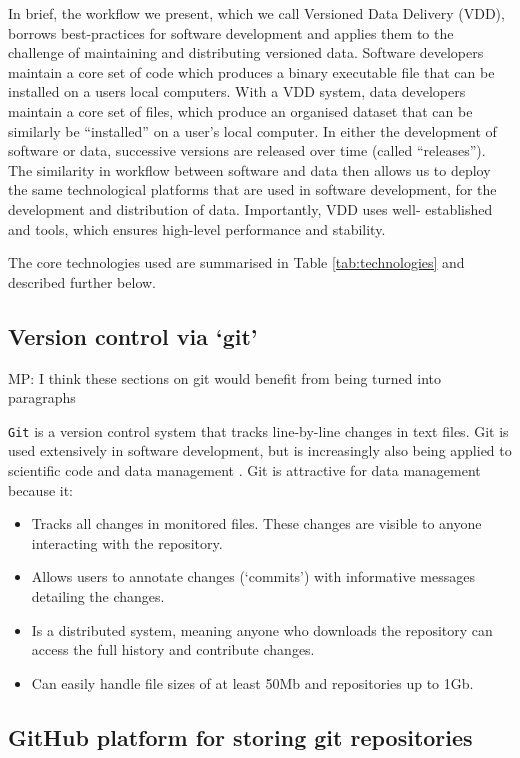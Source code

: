 \documentclass[a4paper,11pt]{article}
\begin{document}
In brief, the workflow we present, which we call Versioned Data Delivery (VDD), borrows best-practices for software
development and applies them to the challenge of maintaining and distributing
versioned data. Software developers maintain a core set of code which produces
a binary executable file that can be installed on a users local  computers. With a VDD system, data developers maintain a core set of files, which produce an
organised dataset that can be similarly be ``installed'' on a user's local
computer. In either the development of software or data, successive versions
are released over time (called ``releases''). The similarity in workflow
between software and data then allows us to deploy the same technological
platforms that are used in software development, for the development and
distribution of data. Importantly, VDD uses well-
established and tools, which ensures high-level performance and stability.

The core technologies used are summarised in Table \ref{tab:technologies} and
described further below.

\subsection{Version control via `git'}

MP: I think these sections on git would benefit from being turned into paragraphs

\texttt{Git} is a version control system that tracks line-by-line changes in text
files. Git is used extensively in software development, but is increasingly
also being applied to scientific code and data management \citep{Ram-2013,
Perkel-2016}. Git is attractive for data management because it: 
\begin{itemize}
  \item Tracks all changes in monitored files. These changes are visible to
  anyone interacting with the repository.
  \item Allows users to annotate changes (`commits') with informative messages
  detailing the changes.
  \item Is a distributed system, meaning anyone who downloads the repository
  can access the full history and contribute changes.
  \item Can easily handle file sizes of at least 50Mb and repositories up to 1Gb.
\end{itemize}

\subsection{GitHub platform for storing git repositories}
\end{document}
